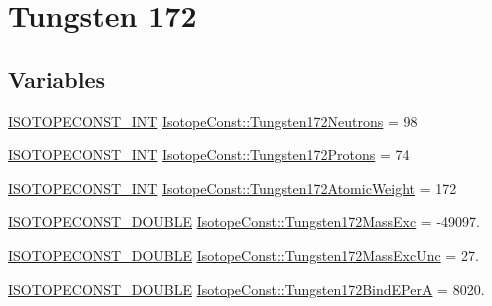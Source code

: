 \hypertarget{group___isotope_const-_tungsten-_w172}{}\section{Tungsten 172}
\label{group___isotope_const-_tungsten-_w172}
\subsection*{Variables}
\begin{DoxyCompactItemize}
\item 
\mbox{\hyperlink{group___isotope_const-_macros_ga5f18360b3e99483a35c32d789e62621c}{I\+S\+O\+T\+O\+P\+E\+C\+O\+N\+S\+T\+\_\+\+I\+NT}} \mbox{\hyperlink{group___isotope_const-_tungsten-_w172_ga3bc2f5f96eab3708e6c333ef33c0450b}{Isotope\+Const\+::\+Tungsten172\+Neutrons}} = 98
\item 
\mbox{\hyperlink{group___isotope_const-_macros_ga5f18360b3e99483a35c32d789e62621c}{I\+S\+O\+T\+O\+P\+E\+C\+O\+N\+S\+T\+\_\+\+I\+NT}} \mbox{\hyperlink{group___isotope_const-_tungsten-_w172_ga2a2b6856295339d81b5272d7be9066c6}{Isotope\+Const\+::\+Tungsten172\+Protons}} = 74
\item 
\mbox{\hyperlink{group___isotope_const-_macros_ga5f18360b3e99483a35c32d789e62621c}{I\+S\+O\+T\+O\+P\+E\+C\+O\+N\+S\+T\+\_\+\+I\+NT}} \mbox{\hyperlink{group___isotope_const-_tungsten-_w172_ga61d45fa88e07b06a6eb5e36dc826a2e7}{Isotope\+Const\+::\+Tungsten172\+Atomic\+Weight}} = 172
\item 
\mbox{\hyperlink{group___isotope_const-_macros_ga8f45a7272ce02c0b4c65c44636ed719a}{I\+S\+O\+T\+O\+P\+E\+C\+O\+N\+S\+T\+\_\+\+D\+O\+U\+B\+LE}} \mbox{\hyperlink{group___isotope_const-_tungsten-_w172_ga119e5e8484eb2e086b7cf7e047cf161e}{Isotope\+Const\+::\+Tungsten172\+Mass\+Exc}} = -\/49097.
\item 
\mbox{\hyperlink{group___isotope_const-_macros_ga8f45a7272ce02c0b4c65c44636ed719a}{I\+S\+O\+T\+O\+P\+E\+C\+O\+N\+S\+T\+\_\+\+D\+O\+U\+B\+LE}} \mbox{\hyperlink{group___isotope_const-_tungsten-_w172_ga743b76178b5aaeb01d5ca69def8b5c64}{Isotope\+Const\+::\+Tungsten172\+Mass\+Exc\+Unc}} = 27.
\item 
\mbox{\hyperlink{group___isotope_const-_macros_ga8f45a7272ce02c0b4c65c44636ed719a}{I\+S\+O\+T\+O\+P\+E\+C\+O\+N\+S\+T\+\_\+\+D\+O\+U\+B\+LE}} \mbox{\hyperlink{group___isotope_const-_tungsten-_w172_ga7616bcdc44e84f10a14b38798849f3da}{Isotope\+Const\+::\+Tungsten172\+Bind\+E\+PerA}} = 8020.
\item 

\end{DoxyCompactItemize}
